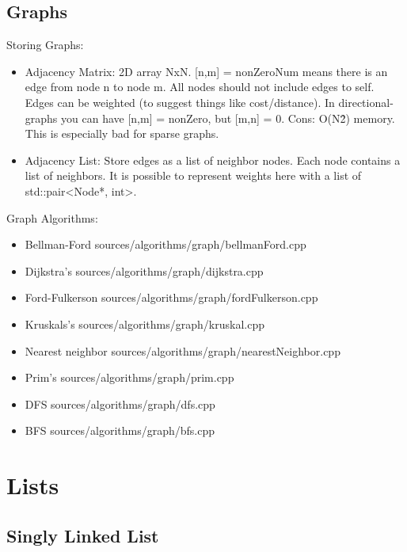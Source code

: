 \documentclass{article}
\begin{document}
        \subsection{Graphs}
          Storing Graphs:
          \begin{itemize}
            \item Adjacency Matrix: 2D array NxN. [n,m] = nonZeroNum means there is an edge from node n to node m. All nodes should not include edges to self. Edges can be weighted (to suggest things like cost/distance). In directional-graphs you can have [n,m] = nonZero, but [m,n] = 0. Cons: O(N\^2) memory. This is especially bad for sparse graphs.
            \item Adjacency List: Store edges as a list of neighbor nodes. Each node contains a list of neighbors. It is possible to represent weights here with a list of std::pair<Node*, int>.
          \end{itemize}
          Graph Algorithms:
          \begin{itemize}
            \item Bellman-Ford
               {sources/algorithms/graph/bellmanFord.cpp}
            \item Dijkstra's
               {sources/algorithms/graph/dijkstra.cpp}
            \item Ford-Fulkerson
               {sources/algorithms/graph/fordFulkerson.cpp}
            \item Kruskals's
               {sources/algorithms/graph/kruskal.cpp}
            \item Nearest neighbor
               {sources/algorithms/graph/nearestNeighbor.cpp}
            \item Prim's
               {sources/algorithms/graph/prim.cpp}
            \item DFS
               {sources/algorithms/graph/dfs.cpp}
            \item BFS
               {sources/algorithms/graph/bfs.cpp}
          \end{itemize}
    \section{Lists}
        \subsection{Singly Linked List}
\end{document}
